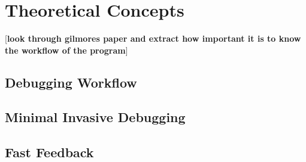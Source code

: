 \chapter{Theoretical Concepts}
[\textbf{look through gilmores paper and extract how important it is to know the workflow of the program}]
\cite{Gilmore1984}
\section{Debugging Workflow}
\section{Minimal Invasive Debugging}
\section{Fast Feedback}
